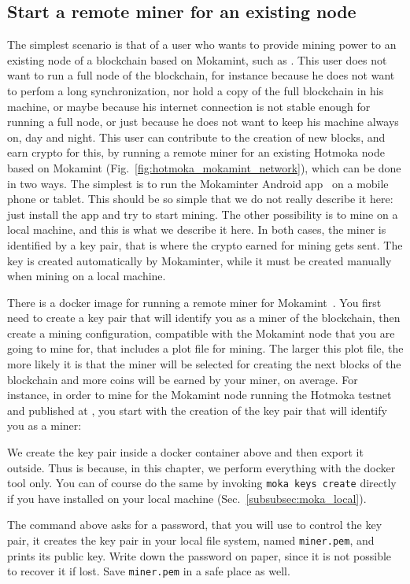\subsection{Start a remote miner for an existing node}\label{subsec:mining_hotmoka_mokamint}

The simplest scenario is that of a user who wants to provide mining power to an existing node of a blockchain
based on Mokamint, such as \serverMokamint{}. This user does not want to run a full node of the blockchain,
for instance because he does not want to perfom a long synchronization, nor hold a copy of the full blockchain
in his machine, or maybe because his internet connection is not stable enough for running a full node, or
just because he does not want to keep his machine always on, day and night. This user can contribute
to the creation of new blocks, and earn crypto for this, by running a remote miner
for an existing Hotmoka node based on Mokamint (Fig.~\ref{fig:hotmoka_mokamint_network}),
which can be done in two ways. The simplest is to run the
Mokaminter Android app~\cite{mokaminter_google_play} on a mobile phone or tablet. This should be so
simple that we do not really describe it here: just install the app and try to start mining. The other possibility
is to mine on a local machine, and this is what we describe it here. In both cases, the miner is identified by a key pair,
that is where the crypto earned for mining gets sent. The key is created automatically by Mokaminter,
while it must be created manually when mining on a local machine.

There is a docker image for running a remote miner for Mokamint~\cite{mokamint_dockerhub}.
You first need to create a key pair that will identify you as a miner of the blockchain, then create a mining configuration,
compatible with the Mokamint node that you are going to mine for, that includes a plot file for mining.
The larger this plot file, the more likely it is that the miner will be selected for creating the next blocks
of the blockchain and more coins will be earned by your miner, on average.
For instance, in order to mine for the Mokamint node running the Hotmoka testnet
and published at \serverMokamintMining{}, you start with the creation of the key pair
that will identify you as a miner:
%
%
\begin{commentbox}
We create the key pair inside a docker container above and then export it outside.
Thus is because, in this chapter, we perform everything with the docker tool only.
You can of course do the same by invoking \texttt{moka keys create} directly if you
have installed on your local machine (Sec.~\ref{subsubsec:moka_local}).
\end{commentbox}
%
The command above asks for a password, that you will use to control the key pair,
it creates the key pair in your local file system, named \texttt{miner.pem},
and prints its public key.
Write down the password on paper, since it is not possible to recover it if lost.
Save \texttt{miner.pem} in a safe place as well.

